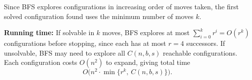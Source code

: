 \documentclass[12pt,twoside]{article}
\begin{document}
\begin{problems}
\begin{problemparts}
Since BFS explores configurations in increasing order of moves taken, the first solved configuration found uses the minimum number of moves $k$.

\textbf{Running time:} If solvable in $k$ moves, BFS explores at most $\sum_{i=0}^k r^i = O(r^k)$ configurations before stopping, since each has at most $r=4$ successors. If unsolvable, BFS may need to explore all $C(n,b,s)$ reachable configurations. Each configuration costs $O(n^2)$ to expand, giving total time
\[
O\big(n^2 \cdot \min\{r^k,\ C(n,b,s)\}\big).
\]

\end{problemparts}

\end{problems}
\end{document}
